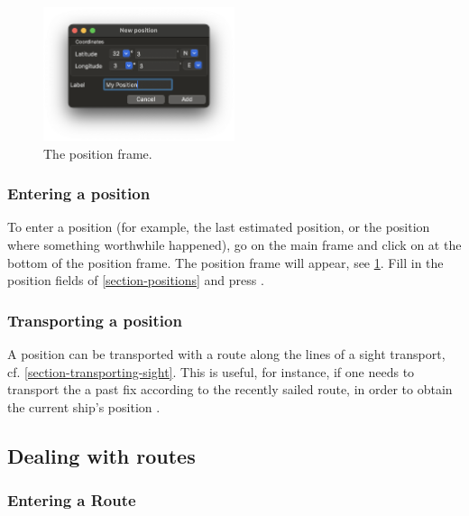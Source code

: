 \documentclass{ol-softwaremanual}
\begin{document}
\begin{figure}
  \centering
  \includegraphics[width=0.5\textwidth]{figures/position-frame.png}
  \caption{
    \label{fig-position-frame}
    The position frame.  
  }
\end{figure}

\subsubsection{Entering a position}\label{section-enter-position}

To enter a position  (for example, the last estimated position, or the position where something worthwhile happened), go on the main frame and click on  at the bottom of the position frame. The position frame will appear, see \cref{fig-position-frame}. Fill in the position fields of \cref{section-positions} and press . 

\subsubsection{Transporting a position}\label{section-transport-position}

A position can be transported with a route along the lines of a sight transport, cf. \cref{section-transporting-sight}. This is useful, for instance, if one needs to transport the a past fix according to the recently sailed route, in order to obtain the current ship's position \cite{bowditch2002the}. 


\subsection{Dealing with routes}\label{section-routes}


\subsubsection{Entering a Route}\label{section-entering-route}
\end{document}
